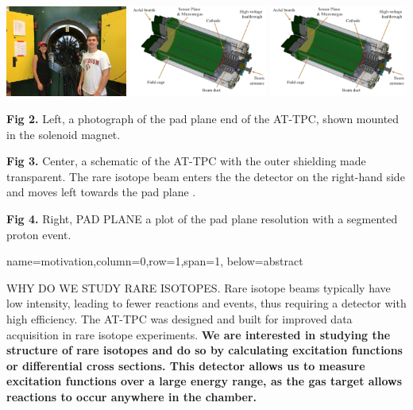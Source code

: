 \documentclass[ansiepaper,portrait]{baposter}
\begin{document}
\begin{poster}
{\begin{center}
\includegraphics [height=30mm]{michigan_trip.jpg} 
\hspace{0.2cm}
\includegraphics [height=30mm] {attpc.png}
\hspace{0.2cm}
\includegraphics [height=30mm] {attpc.png}
\end{center}


\small{\textbf{Fig 2.} Left, a photograph of the pad plane end of the AT-TPC, shown mounted in the solenoid magnet.}

\small{\textbf{Fig 3.} Center, a schematic of the AT-TPC with the outer shielding made transparent. The rare isotope beam enters the the detector on the right-hand side and moves left towards the pad plane \cite{Bradt-thesis}.}

\small{\textbf{Fig 4.} Right, PAD PLANE a plot of the pad plane resolution with a segmented proton event.}

}
{name=motivation,column=0,row=1,span=1, below=abstract}
{\small{WHY DO WE STUDY RARE ISOTOPES. Rare isotope beams typically have low intensity, leading to fewer reactions and events, thus requiring a detector with high efficiency. The AT-TPC was designed and built for improved data acquisition in rare isotope experiments. \textbf{We are interested in studying the structure of rare isotopes and do so by calculating excitation functions or differential cross sections. This detector allows us to measure excitation functions over a large energy range, as the gas target allows reactions to occur anywhere in the chamber.}

}}
\end{poster}
\end{document}
